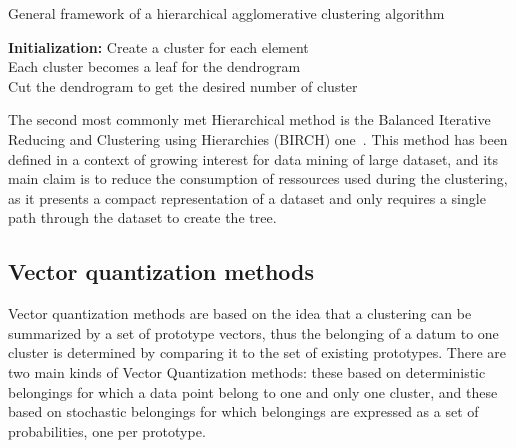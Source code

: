     \begin{algorithm}[H]
        \caption{General framework of a hierarchical agglomerative clustering algorithm}
        \textbf{Initialization:} Create a cluster for each element\\
        Each cluster becomes a leaf for the dendrogram\\
        Cut the dendrogram to get the desired number of cluster
\label{alg:hierarch}
    \end{algorithm}

    \vspace{0.8cm}

    The second most commonly met Hierarchical method is the Balanced Iterative Reducing and Clustering using Hierarchies (BIRCH) one~\cite{zhang1997birch}. This method has been defined in a context of growing interest for data mining of large dataset, and its main claim is to reduce the consumption of ressources used during the clustering, as it presents a compact representation of a dataset and only requires a single path through the dataset to create the tree.

    \subsection{Vector quantization methods}
\label{sec:cluster_vector_quantization}

    Vector quantization methods are based on the idea that a clustering can be summarized by a set of prototype vectors, thus the belonging of a datum to one cluster is determined by comparing it to the set of existing prototypes. There are two main kinds of Vector Quantization methods: these based on deterministic belongings for which a data point belong to one and only one cluster, and these based on stochastic belongings for which belongings are expressed as a set of probabilities, one per prototype. 

